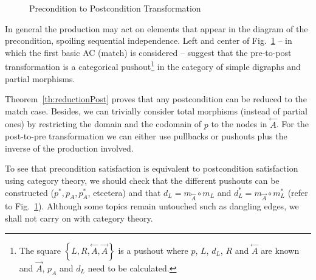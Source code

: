 \documentclass{fundam}
\begin{document}
\begin{figure}[htb]
  \centering
  \caption{Precondition to Postcondition Transformation}
  \label{fig:prePostTrans}
\end{figure}

In general the production may act on elements that appear in the
diagram of the precondition, spoiling sequential independence. Left
and center of Fig.~\ref{fig:prePostTrans} -- in which the first basic
AC (match) is considered -- suggest that the pre-to-post
transformation is a categorical pushout\footnote{The square $\left\{L,
    R, \stackrel{\leftarrow}{A}, \stackrel{\rightarrow}{A} \right\}$
  is a pushout where $p$, $L$, $d_L$, $R$ and
  $\stackrel{\leftarrow}{A}$ are known and
  $\stackrel{\rightarrow}{A}$, $p_A$ and $d_L$ need to be calculated.}
in the category of simple digraphs and partial morphisms.

Theorem~\ref{th:reductionPost} proves that any postcondition can be
reduced to the match case. Besides, we can trivially consider total
morphisms (instead of partial ones) by restricting the domain and the
codomain of $p$ to the nodes in $\stackrel{\leftarrow}{A}$. For the
post-to-pre transformation we can either use pullbacks or pushouts
plus the inverse of the production involved.

To see that precondition satisfaction is equivalent to postcondition
satisfaction using category theory, we should check that the different
pushouts can be constructed ($p^*, p_A, p^*_A$, etcetera) and that
$d_L = m_{\stackrel{\leftarrow}{A}} \circ m_L$ and $d^*_L =
m_{\stackrel{\rightarrow}{A}} \circ m^*_L$ (refer to
Fig.~\ref{fig:prePostTrans}). Although some topics remain untouched
such as dangling edges, we shall not carry on with category theory.
\end{document}
